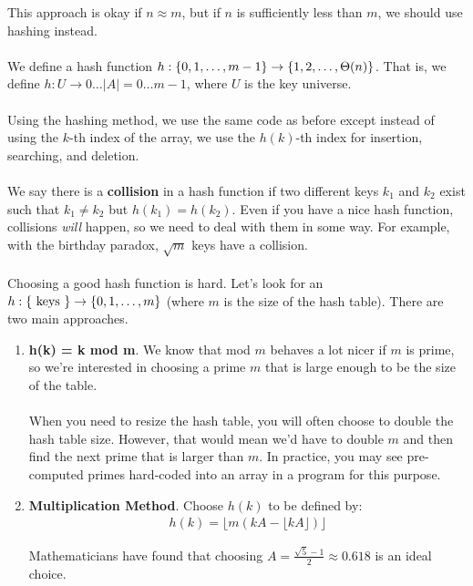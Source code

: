 \documentclass[]{article}
\theoremstyle{definition}
\DeclarePairedDelimiter{\set}{\lbrace}{\rbrace}
\newcommand{\lecture}[1]{\marginpar{{\footnotesize $\leftarrow$ \underline{#1}}}}
\begin{document}
		This approach is okay if $n \approx m$, but if $n$ is sufficiently less than $m$, we should use hashing instead.
		\\ \\
		We define a hash function $h: \set{0, 1, \ldots, m - 1} \to \set{1, 2, \ldots, \Theta(n)}$. That is, we define $h: U \to 0 \ldots |A| = 0 \ldots m - 1$, where $U$ is the key universe.
		\\ \\
		Using the hashing method, we use the same code as before except instead of using the $k$-th index of the array, we use the $h(k)$-th index for insertion, searching, and deletion.
		\\ \\
		We say there is a \textbf{collision} in a hash function if two different keys $k_1$ and $k_2$ exist such that $k_1 \ne k_2$ but $h(k_1) = h(k_2)$. Even if you have a nice hash function, collisions \emph{will} happen, so we need to deal with them in some way. For example, with the birthday paradox, $\sqrt{m}$ keys have a collision.
		\\ \\
		Choosing a good hash function is hard. Let's look for an $h: \set{\text{ keys }} \to \set{0, 1, \ldots, m}$ (where $m$ is the size of the hash table). There are two main approaches. \lecture{February 26, 2013}
		\begin{enumerate}
			\item \textbf{h(k) = k mod m}. We know that mod $m$ behaves a lot nicer if $m$ is prime, so we're interested in choosing a prime $m$ that is large enough to be the size of the table.
				\\ \\
				When you need to resize the hash table, you will often choose to double the hash table size. However, that would mean we'd have to double $m$ and then find the next prime that is larger than $m$. In practice, you may see pre-computed primes hard-coded into an array in a program for this purpose.
			\item \textbf{Multiplication Method}. Choose $h(k)$ to be defined by:
				\begin{align*}
					h(k) = \lfloor m(kA - \lfloor kA \rfloor) \rfloor
				\end{align*}

				Mathematicians have found that choosing $A = \frac{\sqrt 5 - 1}{2} \approx 0.618$ is an ideal choice.
		\end{enumerate}
\end{document}
